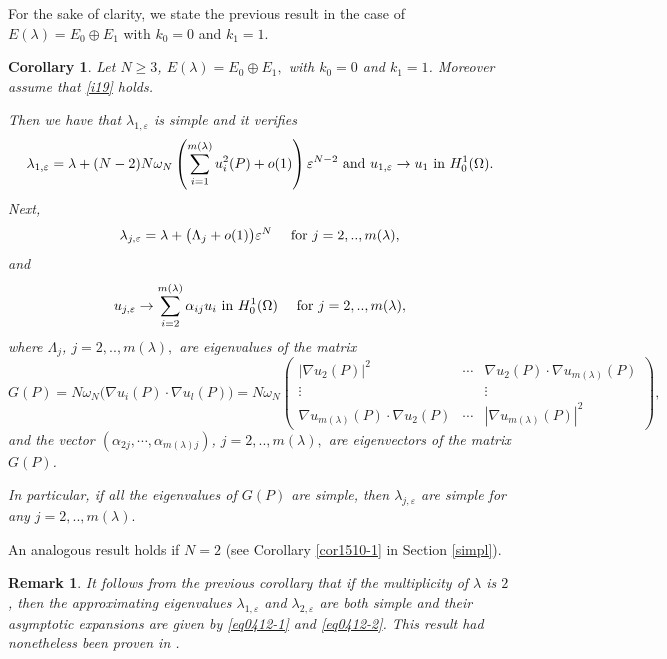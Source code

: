 \documentclass[11pt,reqno]{article}
\newtheorem{cor}[teo]{Corollary}
\newtheorem{rem}[teo]{Remark}
\numberwithin{equation}{section}
\newcommand\e\varepsilon
\newcommand\la\lambda
\newcommand\La\Lambda
\renewcommand\o\omega
\renewcommand\O\Omega
\begin{document}
    
For the sake of clarity, we state the previous result in the case of $E(\lambda)=E_0\oplus E_1$ with $k_0=0$ and $k_1=1$.
	\begin{cor}\label{cor4.2}
		Let $N\ge 3$,
		$E(\la)=E_0\oplus E_1,$  with $k_0=0$ and $k_1=1$. Moreover assume that \eqref{i19} holds.
        
		Then we have that $\la_{1,\e}$ is simple and it verifies 
			\begin{equation}\label{eq0412-1}
				\la_{1,\e}=\la +(N-2)N\o_N\left(\sum_{i=1}^{m(\la)}u_i^2(P)+o(1)\right)\e^{N-2}\hbox{ and }u_{1,\e}\to u_1 \hbox{ in } H^1_0(\O).
			\end{equation}
		Next,
		\begin{equation}\label{eq0412-2}
			\la_{j,\e}=\la +\big(\La_j+o(1)\big)\e^N\quad\hbox{ for }j=2,..,m(\la), 
		\end{equation}
and
\begin{equation}\label{eq0412-2bis}
			u_{j,\e}\to \sum_{i=2}^{m(\lambda)}\alpha_{ij}u_i\hbox{ in } H^1_0(\O)\quad\hbox{ for }j=2,..,m(\la),
		\end{equation}       
		where $\La_j$, $j=2,..,m(\la),$ are eigenvalues of the matrix 
			\begin{equation*}\label{mat*}
				G(P)=N\o_N\big(\nabla u_i(P)\cdot\nabla u_l(P)
				\big)=N\o_N\begin{pmatrix}
					|\nabla u_2(P)|^2&\cdots&\nabla u_2(P)\cdot\nabla u_{m(\la)}(P)\\
				\vdots&  &\vdots\\
					\nabla u_{m(\la)}(P)\cdot\nabla u_2(P)&\cdots&
					|\nabla u_{m(\la)}(P)|^2
				\end{pmatrix},
			\end{equation*}
       and the vector $(\alpha_{2j},\cdots,\alpha_{m(\lambda)j})$, $j=2,..,m(\la),$ are eigenvectors of the matrix $G(P)$.
            
		In particular, if all the eigenvalues of $G(P)$ are simple, then $\la_{j,\e}$ are simple for any $j=2,..,m(\la).$ \\
	\end{cor}
    An analogous result holds if $N=2$ (see Corollary \ref{cor1510-1} in Section \ref{simpl}).
    \begin{rem}\label{ir1}
It follows from the previous corollary that if the multiplicity of $\la$ is $2$, then the approximating eigenvalues $\la_{1,\e}$ and $\la_{2,\e}$ are both simple and their asymptotic expansions are given by \eqref{eq0412-1} and \eqref{eq0412-2}. This result had nonetheless been proven in \cite{alm1,alm2}.
\end{rem}
\end{document}
